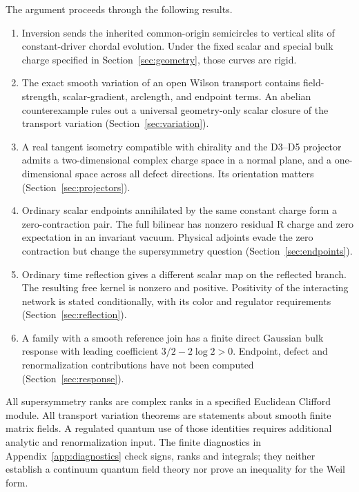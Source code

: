 The argument proceeds through the following results.
\begin{enumerate}
 \item Inversion sends the inherited common-origin semicircles to
 vertical slits of constant-driver chordal evolution. Under the fixed
 scalar and special bulk charge specified in
 Section~\ref{sec:geometry}, those curves are rigid.
 \item The exact smooth variation of an open Wilson transport contains
 field-strength, scalar-gradient, arclength, and endpoint terms. An
 abelian counterexample rules out a universal geometry-only scalar
 closure of the transport variation (Section~\ref{sec:variation}).
 \item A real tangent isometry compatible with chirality and the D3--D5
 projector admits a two-dimensional complex charge space in a normal
 plane, and a one-dimensional space across all defect directions.
 Its orientation matters (Section~\ref{sec:projectors}).
 \item Ordinary scalar endpoints annihilated by the same constant charge
 form a zero-contraction pair. The full bilinear has nonzero residual
 R charge and zero expectation in an invariant vacuum. Physical adjoints
 evade the zero contraction but change the supersymmetry question
 (Section~\ref{sec:endpoints}).
 \item Ordinary time reflection gives a different scalar map on the
 reflected branch. The resulting free kernel is nonzero and positive.
 Positivity of the interacting network is stated conditionally, with
 its color and regulator requirements (Section~\ref{sec:reflection}).
 \item A family with a smooth reference join has a finite direct
 Gaussian bulk response with leading coefficient
 $3/2-2\log2>0$. Endpoint, defect and renormalization contributions
 have not been computed (Section~\ref{sec:response}).
\end{enumerate}

All supersymmetry ranks are complex ranks in a specified Euclidean
Clifford module. All transport variation theorems are statements about
smooth finite matrix fields. A regulated quantum use of those identities
requires additional analytic and renormalization input. The finite
diagnostics in Appendix~\ref{app:diagnostics} check signs, ranks and
integrals; they neither establish a continuum quantum field theory nor
prove an inequality for the Weil form.
